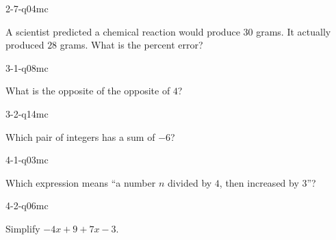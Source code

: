 \begin{practiceQuestion}{2-7-q04}{mc}
\begin{questionText}
A scientist predicted a chemical reaction would produce $30$ grams. It actually produced $28$ grams. What is the percent error?
\end{questionText}
\end{practiceQuestion}

\begin{practiceQuestion}{3-1-q08}{mc}
\begin{questionText}
What is the opposite of the opposite of $4$?
\end{questionText}
\end{practiceQuestion}

\begin{practiceQuestion}{3-2-q14}{mc}
\begin{questionText}
Which pair of integers has a sum of $-6$?
\end{questionText}
\end{practiceQuestion}

\begin{practiceQuestion}{4-1-q03}{mc}
\begin{questionText}
Which expression means ``a number $n$ divided by $4$, then increased by $3$''?
\end{questionText}
\end{practiceQuestion}

\begin{practiceQuestion}{4-2-q06}{mc}
\begin{questionText}
Simplify $-4x + 9 + 7x - 3$.
\end{questionText}
\end{practiceQuestion}


